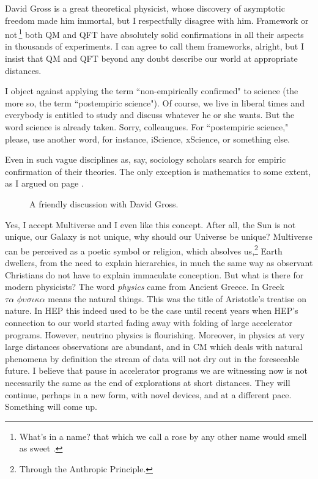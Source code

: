 \documentclass[epsfig,12pt]{article}
\begin{document}
David Gross is a great theoretical physicist, whose discovery of asymptotic freedom made him immortal, but I respectfully disagree with him. Framework or not\,\footnote{What's in a name? that which we call a rose
by any other name would smell as sweet \cite{DS}.} both QM and QFT have absolutely solid confirmations in all their aspects in thousands of experiments. I can agree to call them frameworks, alright, but I insist that  QM and QFT beyond any doubt describe our world at appropriate distances.  

I object against applying the term ``non-empirically confirmed" to science (the more so, the term ``postempiric science"). Of course, we live in liberal times and everybody is entitled to 
 study and discuss  whatever he or she wants. But the word science is already taken. Sorry, colleaugues.  For ``postempiric science," please, use another word, for instance,
iScience, xScience, or something else.

Even in such vague disciplines as, say, sociology
scholars search for empiric confirmation of their theories. The only exception is  mathematics to some extent, as I argued on page \pageref{p6}.

\begin{figure}[h]
\epsfxsize=11cm
\centerline{}
\caption{\small
A friendly discussion with David Gross.}
\label{figu4o}
\end{figure}

\label{p14}
Yes, I accept Multiverse and I even like this concept. After all, the Sun is not unique, our Galaxy is not unique, why should our Universe be unique? Multiverse  can be perceived as a poetic symbol or religion, which absolves us,\footnote{Through the Anthropic Principle.} Earth dwellers, from the need to explain hierarchies, in much the same way as observant Christians do not have to explain immaculate conception. But what is there for modern physicists? The word {\em physics} came from Ancient Greece.  In Greek 
$\tau \alpha \,\, \phi \upsilon \sigma \iota \kappa \alpha $ means the natural things. This was the title of Aristotle's treatise on nature.  In HEP this indeed used to be the case until recent years when  HEP's connection to our world started fading away with folding of large accelerator programs. However, neutrino physics is flourishing. Moreover, in physics at very large distances  observations are abundant, and in CM which deals with natural phenomena by definition the stream of data will not dry out in the foreseeable future. 
I believe that pause in accelerator programs we are witnessing now is not necessarily the same as the end of explorations at short distances. They will continue, perhaps in a new form, with novel devices,  and at a different pace.
Something will come up.
\vspace{2mm}
\end{document}
